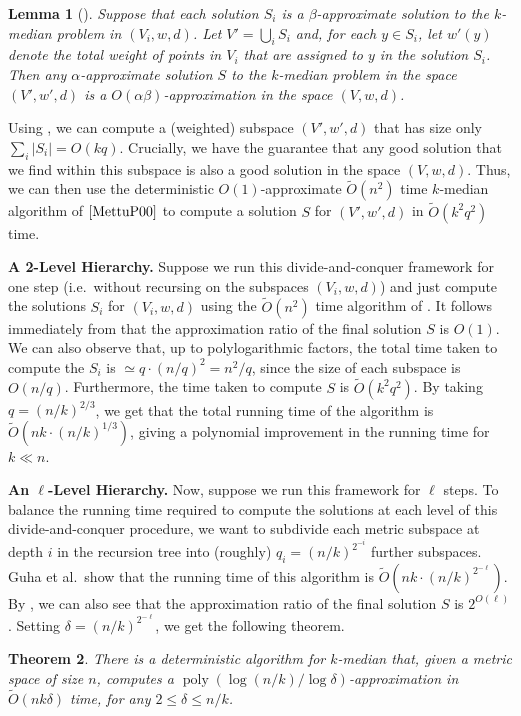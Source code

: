 \documentclass[11pt]{article}
\newcommand{\1}{\mathmybb{1}}
\newtheorem{theorem}{Theorem}[section]
\newtheorem{lemma}[theorem]{Lemma}
\DeclareMathOperator*{\poly}{poly}
\begin{document}
\begin{lemma}[\cite{focs/GuhaMMO00}]\label{lem:intro:sparse}
    Suppose that each solution $S_i$ is a $\beta$-approximate solution to the $k$-median problem in $(V_i, w,d)$.
    Let $V' = \bigcup_i S_i$ and, for each $y \in S_i$, let $w'(y)$ denote the total weight of points in $V_i$ that are assigned to $y$ in the solution $S_i$. Then any $\alpha$-approximate solution $S$ to the $k$-median problem in the space $(V', w', d)$ is a $O(\alpha\beta)$-approximation in the space $(V,w,d)$.
\end{lemma}

Using , we can compute a (weighted) subspace $(V', w', d)$ that has size only $\sum_i |S_i| = O(kq)$. Crucially, we have the guarantee that any good solution that we find within this subspace is also a good solution in the space $(V,w,d)$. Thus, we can then use the deterministic $O(1)$-approximate $\tilde O(n^2)$ time $k$-median algorithm of $\cite{MettuP00}$ to compute a solution $S$ for $(V', w', d)$ in $\tilde O(k^2 q^2)$ time.


\medskip
\noindent \textbf{A 2-Level Hierarchy.} Suppose we run this divide-and-conquer framework for one step (i.e.~without recursing on the subspaces $(V_i, w, d)$) and just compute the solutions $S_i$ for $(V_i, w, d)$ using the $\tilde O(n^2)$ time algorithm of \cite{MettuP00}. It follows immediately from  that the approximation ratio of the final solution $S$ is $O(1)$. We can also observe that, up to polylogarithmic factors, the total time taken to compute the $S_i$ is $\simeq q \cdot (n/q)^2 = n^2/q$, since the size of each subspace is $O(n/q)$. Furthermore, the time taken to compute $S$ is $\tilde O( k^2q^2)$. By taking $q = (n/k)^{2/3}$, we get that the total running time of the algorithm is $\tilde O(nk \cdot (n/k)^{1/3})$, giving a polynomial improvement in the running time for $k \ll n$.

\medskip
\noindent \textbf{An $\ell$-Level Hierarchy.} Now, suppose we  run this framework for $\ell$ steps. To balance the running time required to compute the solutions at each level of this divide-and-conquer procedure, we want to subdivide each metric subspace at depth $i$ in the recursion tree into (roughly) $q_i = (n/k)^{2^{-i}}$ further subspaces. Guha et al.~show that the running time of this algorithm is $\tilde O(nk \cdot (n/k)^{2^{-\ell}})$. By , we can also see that the approximation ratio of the final solution $S$ is $2^{O(\ell)}$. Setting $\delta = (n/k)^{2^{-\ell}}$, we get the following theorem.
\begin{theorem}\label{thm:intro:guha}
    There is a deterministic algorithm for $k$-median that, given a metric space of size $n$, computes a $\poly(\log(n/k) / \log \delta)$-approximation in $\tilde O(nk\delta)$ time, for any $2 \leq \delta \leq n/k$.
\end{theorem}
\end{document}
